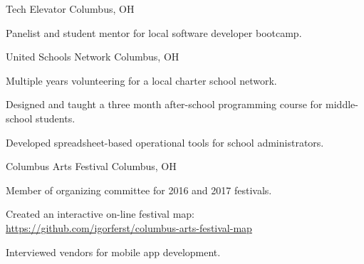 

\begin{cventries}

  \cventryshort
    {Tech Elevator} %
    {Columbus, OH} %
    {
      \begin{cvitems} %
        \item {Panelist and student mentor for local software developer bootcamp.}
      \end{cvitems}
    }

  \cventryshort
    {United Schools Network} %
    {Columbus, OH} %
    {
      \begin{cvitems} %
        \item {Multiple years volunteering for a local charter school network.}
        \item {Designed and taught a three month after-school programming course for middle-school students.}
        \item {Developed spreadsheet-based operational tools for school administrators.}
      \end{cvitems}
    }

  \cventryshort
    {Columbus Arts Festival} %
    {Columbus, OH} %
    {
      \begin{cvitems} %
        \item {Member of organizing committee for 2016 and 2017 festivals.}
        \item {Created an interactive on-line festival map: \url{https://github.com/igorferst/columbus-arts-festival-map}}
        \item {Interviewed vendors for mobile app development.}
      \end{cvitems}
    }

\end{cventries}
